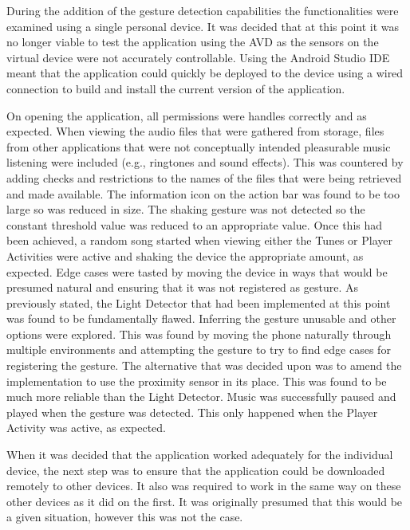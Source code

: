 \documentclass{l4proj}
\begin{document}
During the addition of the gesture detection capabilities the functionalities were examined using a single personal device. It was decided that at this point it was no longer viable to test the application using the AVD as the sensors on the virtual device were not accurately controllable. Using the Android Studio IDE meant that the application could quickly be deployed to the device using a wired connection to build and install the current version of the application.

On opening the application, all permissions were handles correctly and as expected. When viewing the audio files that were gathered from storage, files from other applications that were not conceptually intended pleasurable music listening were included (e.g., ringtones and sound effects). This was countered by adding checks and restrictions to the names of the files that were being retrieved and made available. The information icon on the action bar was found to be too large so was reduced in size. The shaking gesture was not detected so the constant threshold value was reduced to an appropriate value. Once this had been achieved, a random song started when viewing either the Tunes or Player Activities were active and shaking the device the appropriate amount, as expected. Edge cases were tasted by moving the device in ways that would be presumed natural and ensuring that it was not registered as gesture. As previously stated, the Light Detector that had been implemented at this point was found to be fundamentally flawed. Inferring the gesture unusable and other options were explored. This was found by moving the phone naturally through multiple environments and attempting the gesture to try to find edge cases for registering the gesture. The alternative that was decided upon was to amend the implementation to use the proximity sensor in its place. This was found to be much more reliable than the Light Detector. Music was successfully paused and played when the gesture was detected. This only happened when the Player Activity was active, as expected.

When it was decided that the application worked adequately for the individual device, the next step was to ensure that the application could be downloaded remotely to other devices. It also was required to work in the same way on these other devices as it did on the first. It was originally presumed that this would be a given situation, however this was not the case.
\end{document}
